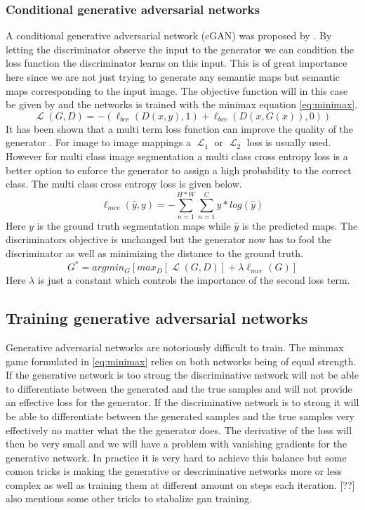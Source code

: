 \documentclass[a4paper,11pt]{article}
\DeclareMathOperator{\Lagr}{\mathcal{L}}
\begin{document}
\subsubsection{Conditional generative adversarial networks}
A conditional generative adversarial network (cGAN) was proposed by \cite{mirza_conditional_2014}.
By letting the discriminator observe the input to the generator we can condition the loss function the discriminator learns on this input. This is of great importance here since we are not just trying to generate any semantic maps but semantic maps corresponding to the input image. The objective function will in this case be given by and the networks is trained with the minimax equation \eqref{eq:minimax}.
\begin{equation}
\Lagr(G, D) =  -(\ell_{bce}(D(x, y), 1) + \ell_{bce}(D(x, G(x)), 0))
\end{equation}
It has been shown that a multi term loss function can improve the quality of the generator \cite{pathak_context_2016, isola_image--image_2016}. For image to image mappings a $\Lagr_1$ or $\Lagr_2$ loss is usually used. However for multi class image segmentation a multi class cross entropy loss is a better option to enforce the generator to assign a high probability to the correct class. The multi class cross entropy loss is given below.
\begin{equation}\label{eq:mce}
\ell_{mce}(\hat{y}, y) = - \sum_{n=1}^{H*W} \sum_{n=1}^{C}y*log(\hat{y})
\end{equation}
Here $y$ is the ground truth segmentation maps while $\hat{y}$ is the predicted maps. The discriminators objective is unchanged but the generator now has to fool the discriminator as well as minimizing the distance to the ground truth.
\begin{equation}
G^{*}=argmin_{G}[max_{D}[\Lagr(G, D)] + \lambda \ell_{mce}(G)]
\end{equation}
Here $\lambda$ is just a constant which controls the importance of the second  loss term.
\subsection{Training generative adversarial networks}
Generative adversarial networks are notoriously difficult to train. The minmax game formulated in \ref{eq:minimax} relies on both networks being of equal strength. If the generative network is too strong the discriminative network will not be able to differentiate between the generated and the true samples and will not provide an effective loss for the generator. If the discriminative network is to strong it will be able to differentiate between the generated samples and the true samples very effectively no matter what the the generator does. The derivative of the loss will then be very small and we will have a problem with vanishing gradients for the generative network. In practice it is very hard to achieve this balance but some comon tricks is making the generative or descriminative networks more or less complex as well as training them at different amount on steps each iteration. [??] also mentions some other tricks to stabalize gan training.
\end{document}
